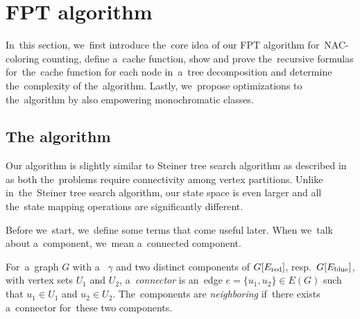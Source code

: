 \section{FPT algorithm}

In~this section, we~first introduce the~core idea of
our FPT algorithm for~NAC-coloring counting,
define a~cache function,
show and prove the~recursive formulas for~the~cache function for each node in~a~tree decomposition
and determine the~complexity of the~algorithm.
Lastly, we~propose optimizations to the~algorithm by also empowering monochromatic classes.


\subsection{The algorithm}

Our algorithm is slightly similar to Steiner tree search algorithm
as described in~\cite{book_parametrized_algorithms} as both the~problems require connectivity
among vertex partitions. Unlike in~the~Steiner tree search algorithm,
our state space is even larger and all the~state mapping operations are significantly different.

Before we~start, we~define some terms that come useful later.
When we~talk about a~component, we~mean a~connected component.
%
\begin{definition}
	For~a~graph \( G \) with a~\rbcol{} \( \gamma \)
	and two distinct components of \( G[E_\text{red}] \), resp.\ \( G[E_\text{blue}] \),
	with vertex sets \( U_1 \) and \( U_2 \),
	a~\emph{connector} is an~edge \( e = \{u_1, u_2\} \in E(G) \)
	such that \( u_1 \in U_1 \) and \( u_2 \in U_2 \).
	The~components are \emph{neighboring} if~there exists
	a~connector for~these two components.
\end{definition}
%

